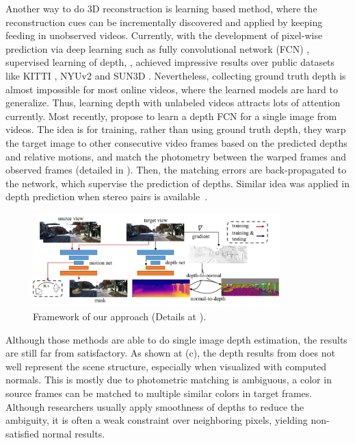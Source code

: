 Another way to do 3D reconstruction is learning based method, where the reconstruction cues can be incrementally discovered and applied by keeping feeding in unobserved videos. Currently, with the development of pixel-wise prediction via deep learning such as fully convolutional network (FCN) \cite{long2015fully}, supervised learning of depth, \eg \cite{eigen2014depth,ummenhofer2016demon}, achieved impressive results over public datasets like KITTI \cite{geiger2012we}, NYUv2 \cite{silberman2012indoor} and SUN3D \cite{xiao2013sun3d}. 
Nevertheless, collecting ground truth depth is almost impossible for most online videos, where the learned models are hard to generalize. 
Thus, learning depth with unlabeled videos attracts lots of attention currently. Most recently,
\cite{zhou2017unsupervised} propose to learn a depth FCN for a single image from videos. The idea is for training, rather than using ground truth depth, they warp the target image to other consecutive video frames based on the predicted depths and relative motions, and match the photometry between the warped frames and observed frames (detailed in ). Then, the matching errors are back-propagated to the network, which supervise the prediction of depths. Similar idea was applied in depth prediction when stereo pairs is available~\cite{GargBR16,godard2016unsupervised}.
\begin{figure}[t]
\centering
\includegraphics[width=0.85\textwidth]{figures/pipeline_comp.pdf}
\caption{Framework of our approach (Details at ).}
\label{fig:pipeline}
\vspace{-1.3\baselineskip}
\end{figure}

Although those methods are able to do single image depth estimation, the results are still far from satisfactory. As shown at (c), the depth results from \cite{zhou2017unsupervised} does not well represent the scene structure, especially when visualized with computed normals. 
This is mostly due to photometric matching is ambiguous, \ie a color in source frames can be matched to multiple similar colors in target frames. Although researchers usually apply smoothness of depths \cite{zhou2017unsupervised} to reduce the ambiguity, it is often a weak constraint over neighboring pixels, yielding non-satisfied normal results.



